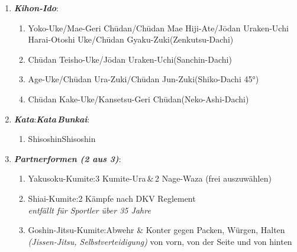 	\begin{enumerate}[nosep]
		\item \textit{\textbf{Kihon-Ido}}:
		\begin{enumerate}[nosep]
			\item Yoko-Uke/Mae-Geri Ch\={u}dan/Ch\={u}dan Mae Hiji-Ate/J\={o}dan Uraken-Uchi\\Harai-Otoshi	Uke/Ch\={u}dan Gyaku-Zuki\tabto{335pt}(Zenkutsu-Dachi)
			\item Ch\={u}dan Teisho-Uke/J\={o}dan Uraken-Uchi\tabto{335pt}(Sanchin-Dachi)
			\item Age-Uke/Ch\={u}dan Ura-Zuki/Ch\={u}dan Jun-Zuki\tabto{335pt}(Shiko-Dachi 45°)
			\item Ch\={u}dan Kake-Uke/Kansetsu-Geri Ch\={u}dan\tabto{335pt}(Neko-Ashi-Dachi)
		\end{enumerate}
		\vspace{12pt}
		\item \textit{\textbf{Kata}}:\tabto{200pt}\textit{\textbf{Kata\,Bunkai}}:
		\begin{enumerate}[nosep]
			\item Shisoshin\tabto{200pt}Shisoshin
		\end{enumerate}
		\vspace{12pt}
		\item \textit{\textbf{Partnerformen (2 aus 3)}}:
		\begin{enumerate}[nosep]
			\item Yakusoku-Kumite:\tabto{200pt}3 Kumite-Ura\,\&\,2 Nage-Waza (frei auszuwählen)
			\item Shiai-Kumite:\tabto{200pt}2 Kämpfe nach DKV Reglement\\\tabto{200pt}\textit{entfällt für Sportler über 35 Jahre}
			\item Goshin-Jitsu-Kumite:\tabto{200pt}Abwehr \& Konter gegen Packen, Würgen, Halten\\\textit{(Jissen-Jitsu, Selbstverteidigung)}\tabto{200pt} von vorn, von der Seite und von hinten
		\end{enumerate}
	\end{enumerate}